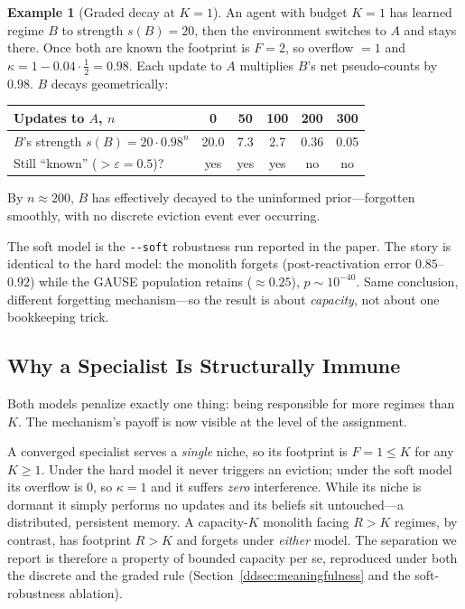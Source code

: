 \documentclass[11pt,a4paper]{article}
\theoremstyle{definition}
\newtheorem{example}{Example}[section]
\theoremstyle{plain}
\begin{document}
\begin{example}[Graded decay at $K=1$]
An agent with budget $K = 1$ has learned regime $B$ to strength $s(B) = 20$, then
the environment switches to $A$ and stays there. Once both are known the footprint
is $F = 2$, so overflow $= 1$ and $\kappa = 1 - 0.04 \cdot \tfrac{1}{2} = 0.98$.
Each update to $A$ multiplies $B$'s net pseudo-counts by $0.98$. $B$ decays
geometrically:
\begin{center}
\begin{tabular}{lccccc}
\toprule
Updates to $A$, $n$ & 0 & 50 & 100 & 200 & 300 \\
\midrule
$B$'s strength $s(B) = 20\cdot 0.98^{n}$ & 20.0 & 7.3 & 2.7 & 0.36 & 0.05 \\
Still ``known'' ($> \varepsilon = 0.5$)? & yes & yes & yes & no & no \\
\bottomrule
\end{tabular}
\end{center}
By $n \approx 200$, $B$ has effectively decayed to the uninformed prior---forgotten
smoothly, with no discrete eviction event ever occurring.
\end{example}

\begin{keypoint}[title={In GAUSE}]
The soft model is the \texttt{-{}-soft} robustness run reported in the paper. The
story is identical to the hard model: the monolith forgets (post-reactivation
error $0.85$--$0.92$) while the GAUSE population retains ($\approx 0.25$),
$p \sim 10^{-40}$. Same conclusion, different forgetting mechanism---so the result
is about \emph{capacity}, not about one bookkeeping trick.
\end{keypoint}

\subsection{Why a Specialist Is Structurally Immune}

Both models penalize exactly one thing: being responsible for more regimes than
$K$. The mechanism's payoff is now visible at the level of the assignment.

\begin{keypoint}
A converged specialist serves a \emph{single} niche, so its footprint is $F = 1
\le K$ for any $K \ge 1$. Under the hard model it never triggers an eviction;
under the soft model its overflow is $0$, so $\kappa = 1$ and it suffers
\emph{zero} interference. While its niche is dormant it simply performs no
updates and its beliefs sit untouched---a distributed, persistent memory. A
capacity-$K$ monolith facing $R > K$ regimes, by contrast, has footprint $R > K$
and forgets under \emph{either} model. The separation we report is therefore a
property of bounded capacity per se, reproduced under both the discrete and the
graded rule (Section~\ref{ddsec:meaningfulness} and the soft-robustness ablation).
\end{keypoint}
\end{document}
